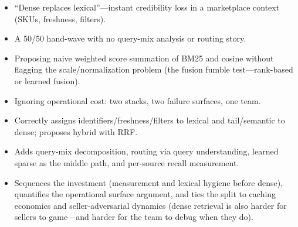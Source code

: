 \begin{interviewq}
\redflags
\begin{itemize}
    \item ``Dense replaces lexical''---instant credibility loss in a marketplace context (SKUs, freshness, filters).
    \item A 50/50 hand-wave with no query-mix analysis or routing story.
    \item Proposing naive weighted score summation of BM25 and cosine without flagging the scale/normalization problem (the fusion fumble test---rank-based or learned fusion).
    \item Ignoring operational cost: two stacks, two failure surfaces, one team.
\end{itemize}


\goodgreat
\begin{itemize}
    \item {} Correctly assigns identifiers/freshness/filters to lexical and tail/semantic to dense; proposes hybrid with RRF.
    \item {} Adds query-mix decomposition, routing via query understanding, learned sparse as the middle path, and per-source recall measurement.
    \item {} Sequences the investment (measurement and lexical hygiene before dense), quantifies the operational surface argument, and ties the split to caching economics and seller-adversarial dynamics (dense retrieval is also harder for sellers to game---and harder for the team to debug when they do).
\end{itemize}

\end{interviewq}

